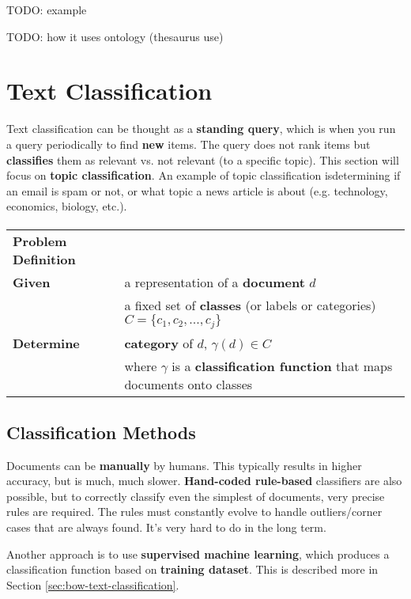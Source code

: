 \documentclass{article}
\begin{document}
TODO: example

TODO: how it uses ontology (thesaurus use)

\section{Text Classification}

Text classification can be thought as a \textbf{standing query}, which is when you run a query periodically to find \textbf{new} items. The query does not rank items but \textbf{classifies} them as relevant vs. not relevant (to a specific topic). This section will focus on \textbf{topic classification}. An example of topic classification isdetermining if an email is spam or not, or what topic a news article is about (e.g. technology, economics, biology, etc.).

\paragraph{}

\begin{tabular}{ll}
\textbf{Problem Definition} \\
\textbf{Given} & a representation of a \textbf{document} $d$ \\
& a fixed set of \textbf{classes} (or labels or categories) $C = \lbrace c_1, c_2, ..., c_j \rbrace$ \\
\textbf{Determine} & \textbf{category} of $d$, $\gamma(d) \in C$ \\
& where $\gamma$ is a \textbf{classification function} that maps documents onto classes \\
\end{tabular}

\subsection{Classification Methods}

Documents can be \textbf{manually} by humans. This typically results in higher accuracy, but is much, much slower. \textbf{Hand-coded rule-based} classifiers are also possible, but to correctly classify even the simplest of documents, very precise rules are required. The rules must constantly evolve to handle outliers/corner cases that are always found. It's very hard to do in the long term.

Another approach is to use \textbf{supervised machine learning}, which produces a classification function based on \textbf{training dataset}. This is described more in Section \ref{sec:bow-text-classification}.
\end{document}
